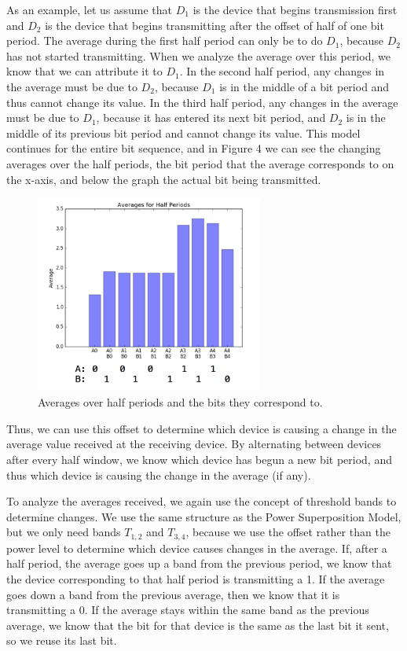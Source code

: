 \documentclass[letterpaper, 10 pt, conference]{IEEEconf}
\begin{document}
As an example, let us assume that $D_1$ is the device that begins transmission first and $D_2$ is the device that begins transmitting after the offset of half of one bit period. The average during the first half period can only be to do $D_1$, because $D_2$ has not started transmitting. When we analyze the average over this period, we know that we can attribute it to $D_1$. In the second half period, any changes in the average must be due to $D_2$, because $D_1$ is in the middle of a bit period and thus cannot change its value. In the third half period, any changes in the average must be due to $D_1$, because it has entered its next bit period, and $D_2$ is in the middle of its previous bit period and cannot change its value. This model continues for the entire bit sequence, and in Figure 4 we can see the changing averages over the half periods, the bit period that the average corresponds to on the x-axis, and below the graph the actual bit being transmitted. 
\begin{figure}[h!]
  \centerline{\includegraphics[width=75mm,scale=0.50]{Figure_4.png}}
  \caption{Averages over half periods and the bits they correspond to.}
\end{figure}

Thus, we can use this offset to determine which device is causing a change in the average value received at the receiving device. By alternating between devices after every half window, we know which device has begun a new bit period, and thus which device is causing the change in the average (if any).

To analyze the averages received, we again use the concept of threshold bands to determine changes. We use the same structure as the Power Superposition Model, but we only need bands $T_{1,2}$ and $T_{3,4}$, because we use the offset rather than the power level to determine which device causes changes in the average. If, after a half period, the average goes up a band from the previous period, we know that the device corresponding to that half period is transmitting a 1. If the average goes down a band from the previous average, then we know that it is transmitting a 0. If the average stays within the same band as the previous average, we know that the bit for that device is the same as the last bit it sent, so we reuse its last bit.
\end{document}
